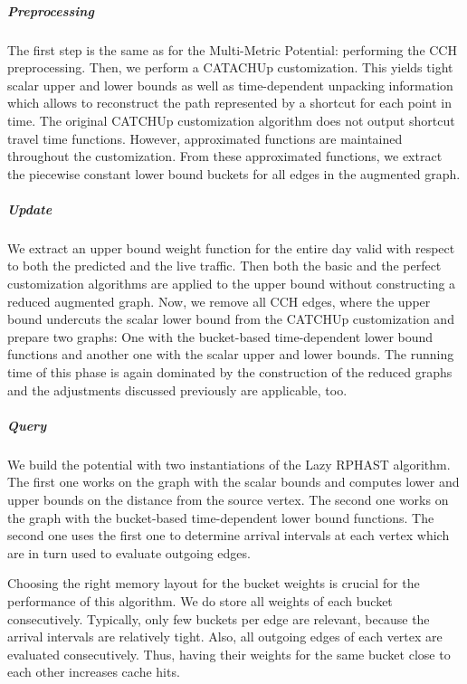 \documentclass[a4paper,UKenglish,cleveref, autoref, thm-restate,anonymous]{lipics-v2021}
\begin{document}
\subparagraph{Preprocessing}
The first step is the same as for the Multi-Metric Potential: performing the CCH preprocessing.
Then, we perform a CATACHUp customization.
This yields tight scalar upper and lower bounds as well as time-dependent unpacking information which allows to reconstruct the path represented by a shortcut for each point in time.
The original CATCHUp customization algorithm does not output shortcut travel time functions.
However, approximated functions are maintained throughout the customization.
From these approximated functions, we extract the piecewise constant lower bound buckets for all edges in the augmented graph.

\subparagraph{Update}
We extract an upper bound weight function for the entire day valid with respect to both the predicted and the live traffic.
Then both the basic and the perfect customization algorithms are applied to the upper bound without constructing a reduced augmented graph.
Now, we remove all CCH edges, where the upper bound undercuts the scalar lower bound from the CATCHUp customization and prepare two graphs:
One with the bucket-based time-dependent lower bound functions and another one with the scalar upper and lower bounds.
The running time of this phase is again dominated by the construction of the reduced graphs and the adjustments discussed previously are applicable, too.


\subparagraph{Query}
We build the potential with two instantiations of the Lazy RPHAST algorithm.
The first one works on the graph with the scalar bounds and computes lower and upper bounds on the distance from the source vertex.
The second one works on the graph with the bucket-based time-dependent lower bound functions.
The second one uses the first one to determine arrival intervals at each vertex which are in turn used to evaluate outgoing edges.

Choosing the right memory layout for the bucket weights is crucial for the performance of this algorithm.
We do store all weights of each bucket consecutively.
Typically, only few buckets per edge are relevant, because the arrival intervals are relatively tight.
Also, all outgoing edges of each vertex are evaluated consecutively.
Thus, having their weights for the same bucket close to each other increases cache hits.
\end{document}
